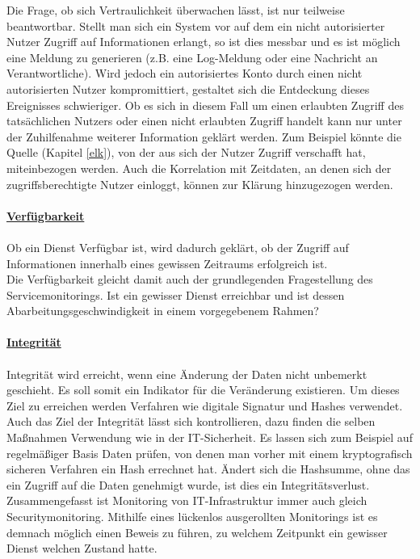 Die Frage, ob sich Vertraulichkeit überwachen lässt, ist nur teilweise beantwortbar.
Stellt man sich ein System vor auf dem ein nicht autorisierter Nutzer Zugriff auf
Informationen erlangt, so ist dies messbar und es ist möglich eine Meldung 
zu generieren (z.B. eine Log-Meldung oder eine Nachricht an Verantwortliche). Wird 
jedoch ein autorisiertes Konto durch einen nicht autorisierten Nutzer kompromittiert,
gestaltet sich die Entdeckung dieses Ereignisses schwieriger. Ob es sich in diesem Fall 
um einen erlaubten Zugriff des tatsächlichen Nutzers oder einen nicht erlaubten Zugriff
handelt kann nur unter der Zuhilfenahme weiterer Information geklärt werden.
Zum Beispiel könnte die Quelle (Kapitel \ref{elk}), von der aus sich der Nutzer Zugriff 
verschafft hat, miteinbezogen werden. Auch die Korrelation mit Zeitdaten, an denen sich 
der zugriffsberechtigte Nutzer einloggt, können zur Klärung hinzugezogen werden.\\\\

\underline{\textbf{Verfügbarkeit}}\\\\
Ob ein Dienst Verfügbar ist, wird dadurch geklärt, ob der Zugriff auf Informationen
innerhalb eines gewissen Zeitraums erfolgreich ist.\\

Die Verfügbarkeit gleicht damit auch der grundlegenden Fragestellung des 
Servicemonitorings. Ist ein gewisser Dienst erreichbar und ist dessen 
Abarbeitungsgeschwindigkeit in einem vorgegebenem Rahmen?\\\\
\newpage
\underline{\textbf{Integrität}}\\\\
Integrität wird erreicht, wenn eine Änderung der Daten nicht unbemerkt geschieht. Es soll 
somit ein Indikator für die Veränderung existieren. Um dieses Ziel zu erreichen werden
Verfahren wie digitale Signatur und Hashes verwendet.\\

Auch das Ziel der Integrität lässt sich kontrollieren, dazu finden die selben Maßnahmen 
Verwendung wie in der IT-Sicherheit. Es lassen sich zum Beispiel auf regelmäßiger Basis 
Daten prüfen, von denen man vorher mit einem kryptografisch sicheren Verfahren ein Hash 
errechnet hat. Ändert sich die Hashsumme, ohne das ein Zugriff auf die Daten genehmigt 
wurde, ist dies ein Integritätsverlust.\\

Zusammengefasst ist Monitoring von IT-Infrastruktur immer auch gleich Securitymonitoring. 
Mithilfe eines lückenlos ausgerollten Monitorings ist es demnach möglich einen Beweis zu 
führen, zu welchem Zeitpunkt ein gewisser Dienst welchen Zustand hatte.
 
